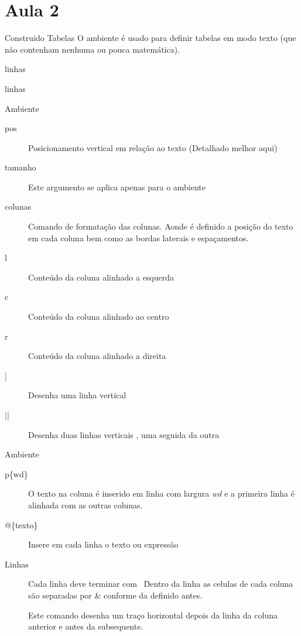 \section{Aula 2}
\begin{frame}{Construido Tabelas}
O ambiente  é usado para definir tabelas em modo texto (que não contenham nenhuma ou pouca matemática).

\begin{LaTeXcode}[Sintaxe]
linhas \\

linhas \\
\end{LaTeXcode}
\end{frame}

\begin{frame}{Ambiente }
\begin{description}
	\item [pos] Posicionamento vertical em relação ao texto (Detalhado melhor aqui)
	\item [tamanho] Este argumento se aplica apenas para o ambiente %
	\item [colunas] Comando de formatação das colunas. Aonde é definido a posição do texto em cada coluna bem como as bordas laterais e espaçamentos.
\end{description}
	\begin{description}
	\item [l] Conteúdo da coluna alinhado a esquerda
	\item [c] Conteúdo da coluna alinhado ao centro
	\item [r] Conteúdo da coluna alinhado a direita
	\item [|] Desenha uma linha vertical
	\item [||] Desenha duas linhas verticais , uma seguida da outra
	\end{description}
\end{frame}

\begin{frame}{Ambiente }
\begin{description}
	\item [p\{wd\}] O texto na coluna é inserido em linha com largura \emph{wd} e a primeira linha é alinhada com as outras colunas.
	\item [@\{texto\}] Insere em cada linha o texto ou expressão
	\item [Linhas] Cada linha deve terminar com \string\ \string\. Dentro da linha as celulas de cada coluna são separadas por \& conforme da definido antes.
	\item [\string\hline] Este comando desenha um traço horizontal depois da linha da coluna anterior e antes da subsequente.
\end{description}
\end{frame}


